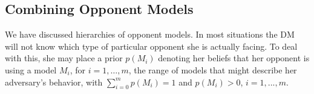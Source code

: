 \subsection{Combining Opponent Models}\label{sec:com}

We have discussed hierarchies of opponent models. 
In most situations the DM will not know which type of particular opponent she is actually facing.
To deal with this, she may place a prior $p(M_i)$ denoting her beliefs that her opponent is using a model $M_i$, for $i = 1, \ldots, m$, the range of models that might describe her adversary's behavior,
with $\sum_{i=0}^m p(M_i) = 1$ and $p(M_i) > 0$,
$i=1,...,m$. 

